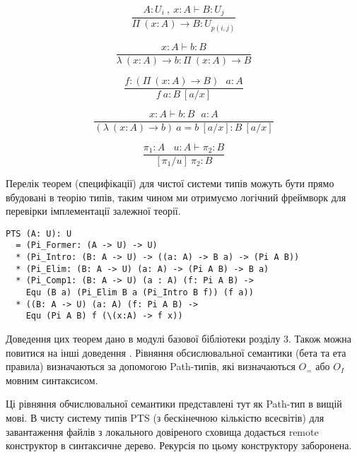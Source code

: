 \begin{equation}
\tag{$\Pi$-formation}
\dfrac
{A:U_i\ ,\ x:A \vdash B : U_j}
{\Pi\ (x:A) \rightarrow B : U_{p(i,j)}}
\end{equation}

\begin{equation}
\tag{$\lambda$-intro}
\dfrac
{x:A \vdash b : B}
{\lambda\ (x:A) \rightarrow b : \Pi\ (x: A) \rightarrow B }
\end{equation}

\begin{equation}
\tag{$App$-elimination}
\dfrac
{f: (\Pi\ (x:A) \rightarrow B)\ \ \ a: A}
{f\ a : B\ [a/x]}
\end{equation}

\begin{equation}
\tag{$\beta$-computation}
\dfrac
{x:A \vdash b: B\ \ \ a:A}
{(\lambda\ (x:A) \rightarrow b)\ a = b\ [a/x] : B\ [a/x]}
\end{equation}

\begin{equation}
\tag{subst}
\dfrac
{\pi_1 : A\ \ \ \ u:A \vdash \pi_2 : B}
{[\pi_1/u]\ \pi_2 : B}
\end{equation}

Перелік теорем (специфікації) для чистої системи типів можуть бути
прямо вбудовані в теорію типів, таким чином ми отримуємо логічний фреймворк
для перевірки імплементації залежної теорії.

\begin{lstlisting}[mathescape=true]
PTS (A: U): U
  = (Pi_Former: (A -> U) -> U)
  * (Pi_Intro: (B: A -> U) -> ((a: A) -> B a) -> (Pi A B))
  * (Pi_Elim: (B: A -> U) (a: A) -> (Pi A B) -> B a)
  * (Pi_Comp1: (B: A -> U) (a : A) (f: Pi A B) ->
    Equ (B a) (Pi_Elim B a (Pi_Intro B f)) (f a))
  * ((B: A -> U) (a: A) (f: Pi A B) ->
    Equ (Pi A B) f (\(x:A) -> f x))
\end{lstlisting}

Доведення цих теорем дано в модулі базової бібліотеки розділу 3.
Також можна повитися на інші доведення \cite{Henk93}.
Рівняння обсислювальної семантики (бета та ета правила) визначаються
за допомогою Path-типів, які визначаються $O_=$ або $O_I$ мовним синтаксисом.

Ці рівняння обчислювальної семантики представлені тут як Path-тип в вищій мові.
В чисту систему типів PTS (з бескінечною кількістю всесвітів)
для завантаження файлів з локального довіреного сховища додається
remote конструктор в синтаксичне дерево. Рекурсія по цьому конструктору заборонена.

